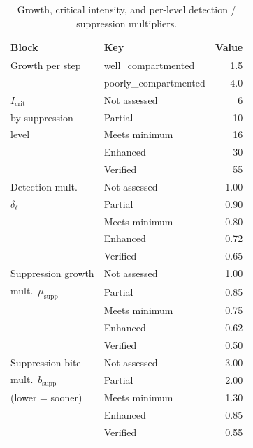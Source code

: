 \documentclass[11pt,a4paper]{article}
\begin{document}
\begin{table}[H]
\centering
\caption{Growth, critical intensity, and per-level detection / suppression
multipliers.}
\begin{tabular}{llr}
\toprule
Block & Key & Value \\
\midrule
Growth per step & well\_compartmented & 1.5 \\
                & poorly\_compartmented & 4.0 \\
\midrule
$I_{\text{crit}}$ & Not assessed & 6 \\
by suppression    & Partial & 10 \\
level             & Meets minimum & 16 \\
                  & Enhanced & 30 \\
                  & Verified & 55 \\
\midrule
Detection mult.\ & Not assessed & 1.00 \\
$\delta_\ell$    & Partial & 0.90 \\
                 & Meets minimum & 0.80 \\
                 & Enhanced & 0.72 \\
                 & Verified & 0.65 \\
\midrule
Suppression growth & Not assessed & 1.00 \\
mult.\ $\mu_{\text{supp}}$ & Partial & 0.85 \\
                 & Meets minimum & 0.75 \\
                 & Enhanced & 0.62 \\
                 & Verified & 0.50 \\
\midrule
Suppression bite & Not assessed & 3.00 \\
mult.\ $b_{\text{supp}}$ & Partial & 2.00 \\
(lower = sooner) & Meets minimum & 1.30 \\
                 & Enhanced & 0.85 \\
                 & Verified & 0.55 \\
\bottomrule
\end{tabular}
\end{table}
\end{document}
